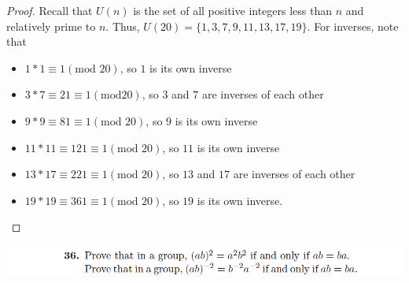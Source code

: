 \documentclass[12pt]{scrartcl}
\begin{document}
\begin{proof}
  Recall that $U(n)$ is the set of all positive integers less than $n$ and relatively prime to $n$. 
  Thus, $U(20) = \{1, 3, 7, 9, 11, 13, 17, 19\}$. For inverses, note that
  \begin{itemize}
    \item $1 * 1 \equiv 1 (\text{mod } 20)$, so $1$ is its own inverse
    \item $3 * 7 \equiv 21 \equiv 1 (\text{mod} 20)$, so $3$ and $7$ are inverses of each other
    \item $9 * 9 \equiv 81 \equiv 1 (\text{mod } 20)$, so $9$ is its own inverse
    \item $11 * 11 \equiv 121 \equiv 1 (\text{mod } 20)$, so $11$ is its own inverse
    \item $13 * 17 \equiv 221 \equiv 1 (\text{mod } 20)$, so $13$ and $17$ are inverses of each other
    \item $19 * 19 \equiv 361 \equiv 1 (\text{mod } 20)$, so $19$ is its own inverse.
  \end{itemize}
\end{proof}

\newpage 

\includegraphics[width=14cm]{36.png}
\end{document}
